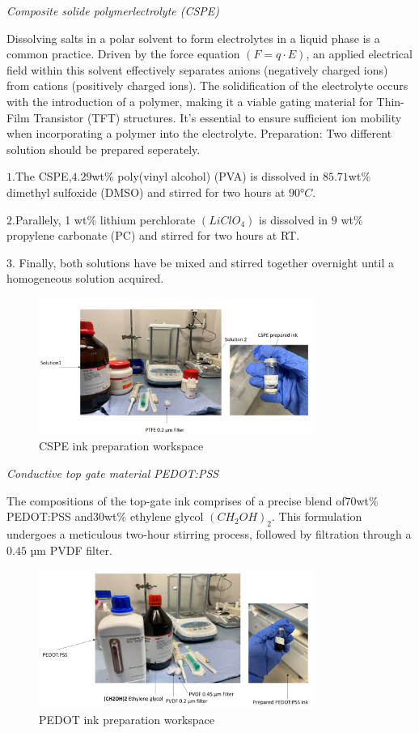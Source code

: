 \textit {Composite solide polymerlectrolyte (CSPE)}

Dissolving salts in a polar solvent to form electrolytes in a liquid phase is a common practice. Driven by the force equation $(F = q · E)$, an applied electrical field within this solvent effectively separates anions (negatively charged ions) from cations (positively charged ions). The solidification of the electrolyte occurs with the introduction of a polymer, making it a viable gating material for Thin-Film Transistor (TFT) structures. It's essential to ensure sufficient ion mobility when incorporating a polymer into the electrolyte.
Preparation:
Two different solution should be prepared seperately.

$1.$The CSPE,$ 4.29 $wt\% poly(vinyl alcohol) (PVA) is dissolved in $85.71 $wt\% dimethyl sulfoxide (DMSO) and stirred for two hours at $90 °C$.

$2.$Parallely, 1 wt\% lithium perchlorate $(LiClO_4)$ is dissolved in $9$ wt\% propylene carbonate
(PC) and stirred for two hours at RT.

$3.$ Finally, both solutions have be mixed and stirred together overnight until a homogeneous solution acquired.

\begin{figure}[h!]
\centering
\includegraphics[width=0.8\textwidth]
{figures/cspeink.png}
\caption[Example of caption.]{CSPE ink preparation workspace\label{CSPEink}}
\end{figure}


\textit {Conductive top gate material PEDOT:PSS}

The compositions of the top-gate ink comprises of a precise blend of$ 70 $wt\% PEDOT:PSS and$ 30 $wt\% ethylene glycol $(CH_2OH)_2$. This formulation undergoes a meticulous two-hour stirring process, followed by filtration through a $0.45$ µm PVDF filter.
 \begin{figure}[h!]
\centering
\includegraphics[width=0.8\textwidth]{figures/pedot.png}
\caption[Example of caption.]{PEDOT ink preparation workspace \label{prdot}}
\end{figure}


